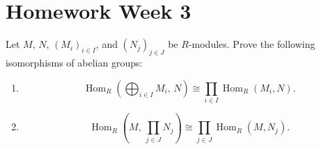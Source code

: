 \section{Homework Week 3}

\begin{exercise}
    Let $M$, $N$, $(M_i)_{i \in I}$, and $(N_j)_{j \in J}$ be $R$-modules. Prove the following isomorphisms of abelian groups:
    \begin{enumerate}
        \item
              \[
                  \operatorname{Hom}_R\!\left(\bigoplus_{i\in I} M_i,\, N\right)
                  \cong
                  \prod_{i\in I}\operatorname{Hom}_R(M_i,N).
              \]
        \item
              \[
                  \operatorname{Hom}_R\!\left(M,\, \prod_{j\in J} N_j\right)
                  \cong
                  \prod_{j\in J}\operatorname{Hom}_R(M,N_j).
              \]
    \end{enumerate}
\end{exercise}

